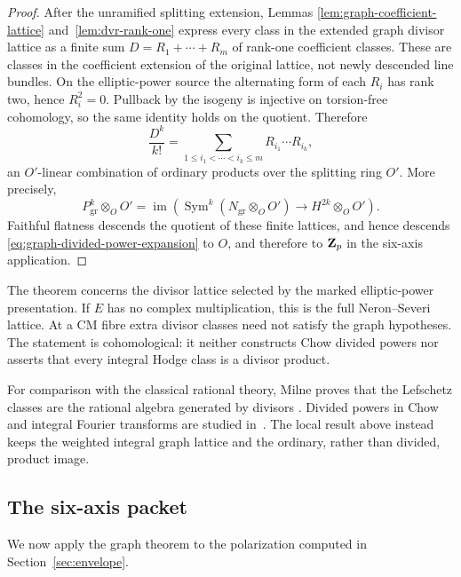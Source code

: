 \begin{proof}
After the unramified splitting extension, Lemmas
\ref{lem:graph-coefficient-lattice} and~\ref{lem:dvr-rank-one} express every
class in the extended graph divisor lattice as a finite sum
\(D=R_1+\cdots+R_m\) of rank-one coefficient classes.  These are classes in
the coefficient extension of the original lattice, not newly descended line
bundles.  On the elliptic-power source the alternating form of each \(R_i\)
has rank two, hence \(R_i^2=0\).  Pullback by the isogeny is injective on
torsion-free cohomology, so the same identity holds on the quotient.
Therefore
\begin{equation}
 \frac{D^k}{k!}=\sum_{1\leq i_1<\cdots<i_k\leq m}
 R_{i_1}\cdots R_{i_k},
 \label{eq:graph-divided-power-expansion}
\end{equation}
an \(O'\)-linear combination of ordinary products over the splitting ring
\(O'\).  More precisely,
\[
 P_{\mathrm{gr}}^k\otimes_OO'
 =\operatorname{im}\!\left(
 \operatorname{Sym}^k(N_{\mathrm{gr}}\otimes_OO')
 \longrightarrow H^{2k}\otimes_OO'\right).
\]
Faithful flatness descends the quotient of these finite lattices, and hence
descends \eqref{eq:graph-divided-power-expansion} to \(O\), and therefore to
\(\mathbf Z_p\) in the six-axis application.
\end{proof}

The theorem concerns the divisor lattice selected by the marked
elliptic-power presentation.  If \(E\) has no complex multiplication, this
is the full Neron--Severi lattice.  At a CM fibre extra divisor classes need
not satisfy the graph hypotheses.  The statement is cohomological: it
neither constructs Chow divided powers nor asserts that every integral Hodge
class is a divisor product.

For comparison with the classical rational theory, Milne proves that the
Lefschetz classes are the rational algebra generated by divisors
\cite[Theorem~3.2]{MilneLefschetz}.  Divided powers in Chow and integral
Fourier transforms are studied in~\cite{MoonenPolishchuk,BdGF}.  The local
result above instead keeps the weighted integral graph lattice and the
ordinary, rather than divided, product image.

\subsection{The six-axis packet}

We now apply the graph theorem to the polarization computed in
Section~\ref{sec:envelope}.

